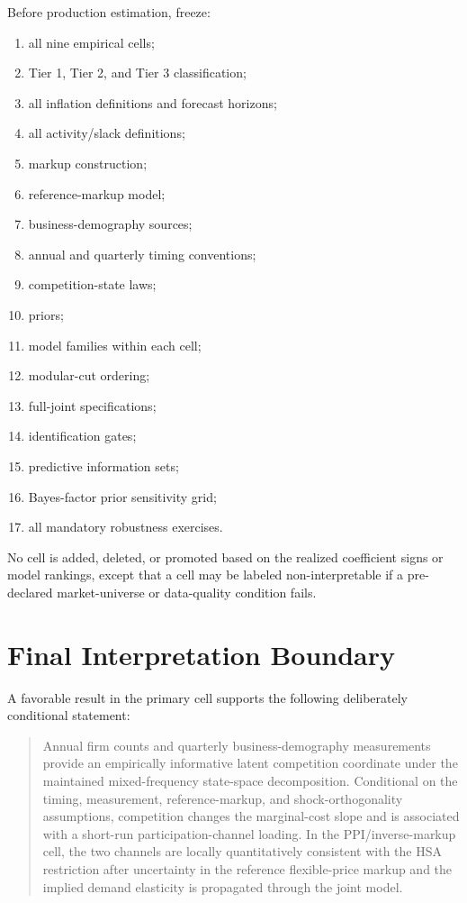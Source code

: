 \documentclass[11pt]{article}
\begin{document}
Before production estimation, freeze:
\begin{enumerate}
\item all nine empirical cells;
\item Tier 1, Tier 2, and Tier 3 classification;
\item all inflation definitions and forecast horizons;
\item all activity/slack definitions;
\item markup construction;
\item reference-markup model;
\item business-demography sources;
\item annual and quarterly timing conventions;
\item competition-state laws;
\item priors;
\item model families within each cell;
\item modular-cut ordering;
\item full-joint specifications;
\item identification gates;
\item predictive information sets;
\item Bayes-factor prior sensitivity grid;
\item all mandatory robustness exercises.
\end{enumerate}

No cell is added, deleted, or promoted based on the realized coefficient signs or model rankings, except that a cell may be labeled non-interpretable if a pre-declared market-universe or data-quality condition fails.

\section{Final Interpretation Boundary}

A favorable result in the primary cell supports the following deliberately conditional statement:

\begin{quote}
Annual firm counts and quarterly business-demography measurements provide an empirically informative latent competition coordinate under the maintained mixed-frequency state-space decomposition. Conditional on the timing, measurement, reference-markup, and shock-orthogonality assumptions, competition changes the marginal-cost slope and is associated with a short-run participation-channel loading. In the PPI/inverse-markup cell, the two channels are locally quantitatively consistent with the HSA restriction after uncertainty in the reference flexible-price markup and the implied demand elasticity is propagated through the joint model.
\end{quote}
\end{document}

